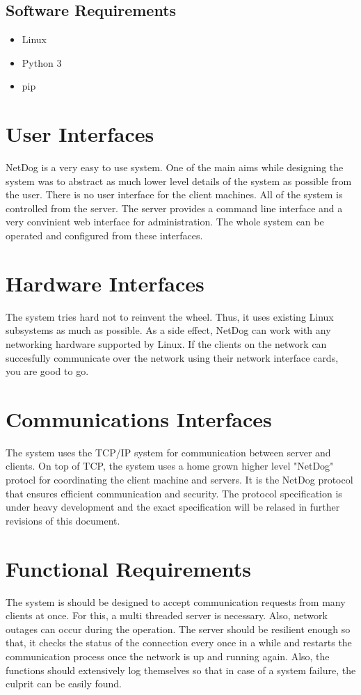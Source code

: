 \subsection{Software Requirements}
\begin{itemize}
    \item Linux
    \item Python 3
    \item pip
\end{itemize}

\section{User Interfaces}
NetDog is a very easy to use system. One of the main aims while designing the
system was to abstract as much lower level details of the system as possible
from the user. There is no user interface for the client machines. All of the
system is controlled from the server. The server provides a command line
interface and a very convinient web interface for administration. The whole
system can be operated and configured from these interfaces.

\section{Hardware Interfaces}
The system tries hard not to reinvent the wheel. Thus, it uses existing Linux
subsystems as much as possible. As a side effect, NetDog can work with any
networking hardware supported by Linux. If the clients on the network can
succesfully communicate over the network using their network interface cards,
you are good to go.

\section{Communications Interfaces}
The system uses the TCP/IP system for communication between server and clients.
On top of TCP, the system uses a home grown higher level "NetDog" protocl for
coordinating the client machine and servers. It is the NetDog protocol that
ensures efficient communication and security. The protocol specification is
under heavy development and the exact specification will be relased in further
revisions of this document.

\section{Functional Requirements}
The system is should be designed to accept communication requests from many
clients at once. For this, a multi threaded server is necessary. Also, network
outages can occur during the operation. The server should be resilient enough
so that, it checks the status of the connection every once in a while and
restarts the communication process once the network is up and running again.
Also, the functions should extensively log themselves so that in case of a
system failure, the culprit can be easily found.


